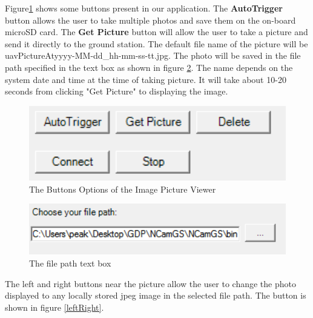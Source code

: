\documentclass[a4paper,11pt]{article}
\begin{document}
Figure\ref{buttons} shows some buttons present in our application. The \textbf{AutoTrigger} button allows the user to take multiple photos and save them on the on-board microSD card. The \textbf{Get Picture} button will allow the user to take a picture and send it directly to the ground station. The default file name of the picture will be uavPictureAtyyyy-MM-dd\_hh-mm-ss-tt.jpg. The photo will be saved in the file path specified in the text box as shown in figure \ref{filePath}. The name depends on the system date and time at the time of taking picture. It will take about 10-20 seconds from clicking "Get Picture" to displaying the image.

\begin{figure}[!htbp]
\begin{center}
\includegraphics[width=1.0\textwidth]{button.PNG}  
\caption{The Buttons Options of the Image Picture Viewer\label{buttons}}
\end{center}
\end{figure}

\begin{figure}[!htbp]
\begin{center}
\includegraphics[width=1.0\textwidth]{filePath.PNG} 
\caption{The file path text box\label{filePath}}
\end{center}
\end{figure}

The left and right buttons near the picture allow the user to change the photo displayed to any locally stored jpeg image in the selected file path. The button is shown in figure \ref{leftRight}. 
\end{document}
